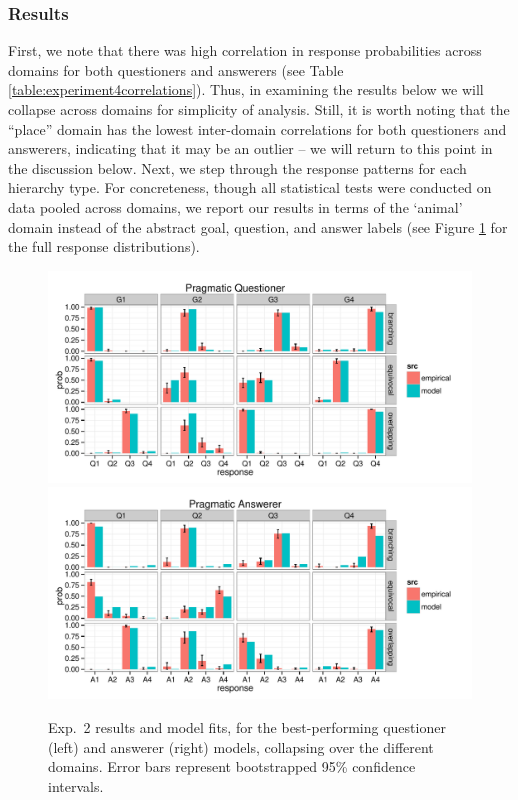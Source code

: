 \documentclass[12pt, floatsintext, jou]{apa6}
\begin{document}
\subsubsection{Results}

First, we note that there was high correlation in response probabilities across domains for both questioners and answerers (see Table \ref{table:experiment4correlations}). Thus, in examining the results below we will collapse across domains for simplicity of analysis. Still, it is worth noting that the ``place'' domain has the lowest inter-domain correlations for both questioners and answerers, indicating that it may be an outlier -- we will return to this point in the discussion below.  Next, we step through the response patterns for each hierarchy type. For concreteness, though all statistical tests were conducted on data pooled across domains, we report our results in terms of the `animal' domain instead of the abstract goal, question, and answer labels (see Figure \ref{fig:exp4res} for the full response distributions).

\begin{figure}[t!]
\begin{center}
\includegraphics[scale = .75]{Exp2QuestResults}
\includegraphics[scale = .75]{Exp2AnsResults}
\end{center}
\caption{Exp.~2 results and model fits, for the best-performing questioner (left) and answerer (right) models, collapsing over the different domains. Error bars represent bootstrapped 95\% confidence intervals.}
\label{fig:exp4res}
\end{figure}
\end{document}
